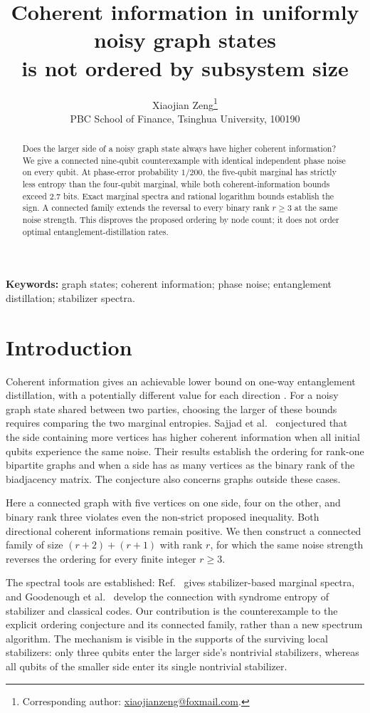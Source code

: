 \documentclass[11pt,a4paper]{article}
\title{Coherent information in uniformly noisy graph states\protect\\ is not ordered by subsystem size}
\author{Xiaojian Zeng\thanks{Corresponding author: \href{mailto:xiaojianzeng@foxmail.com}{xiaojianzeng@foxmail.com}.}\\[3pt]
\small PBC School of Finance, Tsinghua University, 100190}
\date{}
\begin{document}
\maketitle
\begin{abstract}
Does the larger side of a noisy graph state always have higher coherent information?
We give a connected nine-qubit counterexample with identical independent phase noise
on every qubit. At phase-error probability $1/200$, the five-qubit marginal has
strictly less entropy than the four-qubit marginal, while both coherent-information
bounds exceed $2.7$ bits. Exact marginal spectra and rational logarithm bounds
establish the sign. A connected family extends the reversal to every binary rank
$r\geq3$ at the same noise strength. This disproves the proposed ordering by node
count; it does not order optimal entanglement-distillation rates.
\end{abstract}
\noindent\textbf{Keywords:} graph states; coherent information; phase noise; entanglement distillation; stabilizer spectra.

\section{Introduction}

Coherent information gives an achievable lower bound on one-way entanglement
distillation, with a potentially different value for each direction
\cite{DevetakWinter2005}. For a noisy graph state shared between two parties,
choosing the larger of these bounds requires comparing the two marginal entropies.
Sajjad et al.\ \cite[Sec.~5.4]{Sajjad2026lowerbounds} conjectured that the side
containing more vertices has higher coherent information when all initial qubits
experience the same noise. Their results establish the ordering for rank-one
bipartite graphs and when a side has as many vertices as the binary rank of the
biadjacency matrix. The conjecture also concerns graphs outside these cases.

Here a connected graph with five vertices on one side, four on the other, and
binary rank three violates even the non-strict proposed inequality. Both
directional coherent informations remain positive. We then construct a connected
family of size $(r+2)+(r+1)$ with rank $r$, for which the same noise strength
reverses the ordering for every finite integer $r\geq3$.

The spectral tools are established: Ref.~\cite{Sajjad2026lowerbounds} gives
stabilizer-based marginal spectra, and Goodenough et al.\ \cite{Goodenough2024}
develop the connection with syndrome entropy of stabilizer and classical codes.
Our contribution is the counterexample to the explicit ordering conjecture and
its connected family, rather than a new spectrum algorithm. The mechanism is
visible in the supports of the surviving local stabilizers: only three qubits
enter the larger side's nontrivial stabilizers, whereas all qubits of the smaller
side enter its single nontrivial stabilizer.
\end{document}

